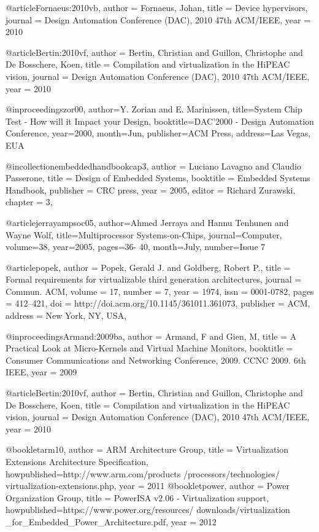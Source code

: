 @article{Fornaeus:2010vb,
author = {Fornaeus, Johan},
title = {{Device hypervisors}},
journal = {Design Automation Conference (DAC), 2010 47th ACM/IEEE},
year = {2010}
}

@article{Bertin:2010vf,
author = {Bertin, Christian and Guillon, Christophe and De Bosschere, Koen},
title = {{Compilation and virtualization in the HiPEAC vision}},
journal = {Design Automation Conference (DAC), 2010 47th ACM/IEEE},
year = {2010}
}

@inproceedings{zor00,
	author={Y. Zorian and E. Marinissen},
	title={System Chip Test - How will it Impact your Design},
	booktitle={DAC'2000 - Design Automation Conference},
	year={2000},
	month={Jun},
	publisher={ACM Press},
	address={Las Vegas, EUA}
}

@incollection{embeddedhandbookcap3,
	author	= {Luciano Lavagno and Claudio Passerone},
	title	= {Design of Embedded Systems},
	booktitle	= {Embedded Systems Handbook},
	publisher	= {{CRC} press},
	year	= {2005},
	editor	= {Richard Zurawski},
	chapter	= {3},
}

@article{jerrayampsoc05,
	author={Ahmed Jerraya  and Hannu Tenhunen and Wayne Wolf},
	title={Multiprocessor Systems-on-Chips},
	journal={Computer},
	volume={38},
	year={2005},
	pages={36- 40},
	month={July},
	number={Issue 7}
}



@article{popek,
 author = {Popek, Gerald J. and Goldberg, Robert P.},
 title = {Formal requirements for virtualizable third generation architectures},
 journal = {Commun. ACM},
 volume = {17},
 number = {7},
 year = {1974},
 issn = {0001-0782},
 pages = {412--421},
 doi = {http://doi.acm.org/10.1145/361011.361073},
 publisher = {ACM},
 address = {New York, NY, USA},
 }



@inproceedings{Armand:2009ba,
author = {Armand, F and Gien, M},
title = {{A Practical Look at Micro-Kernels and Virtual Machine Monitors}},
booktitle = {Consumer Communications and Networking Conference, 2009. CCNC 2009. 6th IEEE},
year = {2009}
}

@article{Bertin:2010vf,
author = {Bertin, Christian and Guillon, Christophe and De Bosschere, Koen},
title = {{Compilation and virtualization in the HiPEAC vision}},
journal = {Design Automation Conference (DAC), 2010 47th ACM/IEEE},
year = {2010}
}


@booklet{arm10,
author = {{ARM Architecture Group}},
title = {{Virtualization Extensions Architecture Specification}},
howpublished={http://www.arm.com/products /processors/technologies/ virtualization-extensions.php},
year = {2011}
}
@booklet{power,
author = {{Power Organization Group}},
title = {{PowerISA v2.06 - Virtualization support}},
howpublished={https://www.power.org/resources/ downloads/virtualization \_for\_Embedded\_Power\_Architecture.pdf},
year = {2012}
}

